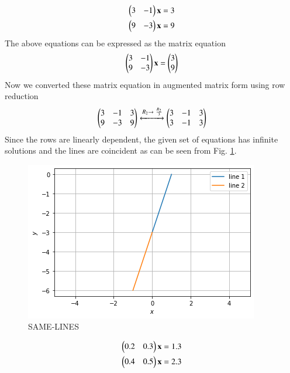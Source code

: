 \item
\begin{align}
\begin{split}
\begin{pmatrix}3 & -1 \end{pmatrix}\mathbf{x}&=3
\\
\begin{pmatrix}9 & -3\end{pmatrix}\mathbf{x}&=9
\end{split}
\end{align}
The above equations can be expressed as the matrix equation
\begin{align}
\begin{pmatrix}3 & -1\\9 & -3\end{pmatrix} \mathbf{x} = \begin{pmatrix}3\\9\end{pmatrix}
\end{align}
%
Now we converted these matrix equation in augmented matrix form using row reduction
\begin{align}
\begin{pmatrix}3 & -1 & 3\\9 & -3 & 9\end{pmatrix} 
\xleftrightarrow {R_2\rightarrow \ \frac{R_2}{3}}\begin{pmatrix}3 & -1 & 3\\3 & -1 & 3\end{pmatrix} 
\end{align}
%
Since the rows are linearly dependent, the given set of equations has infinite solutions and the lines are coincident
as can be seen from Fig. \ref{linform/10/fig:SAME LINES.}.
%
\begin{figure}[ht!]
\centering
\includegraphics[width=\columnwidth]{solutions/su2021/2/10/FIGURES/SAME-LINE.png}
\caption{SAME-LINES}
\label{linform/10/fig:SAME LINES.}
\end{figure} 
%
\item
\begin{align}
\begin{split}
\begin{pmatrix}0.2 & 0.3 \end{pmatrix}\mathbf{x}&=1.3
\\
\begin{pmatrix}0.4 & 0.5\end{pmatrix}\mathbf{x}&=2.3
\end{split}
\end{align}

